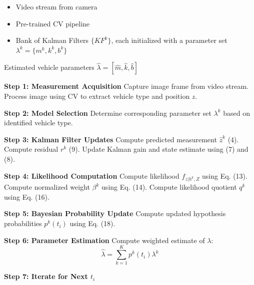 \documentclass[letterpaper, 10 pt, conference]{ieeeconf}  %
\begin{document}
\begin{algorithm}
\caption{CV Informed Multiple-Model Adaptive Estimation (MMAE) for Vehicle Parameter Estimation} 
\label{alg:mmae}
\begin{algorithmic}[1]
    \Require 
    \begin{itemize}
        \item Video stream from camera
        \item Pre-trained CV pipeline
        \item Bank of Kalman Filters $\{KF^k\}$, each initialized with a parameter set $\lambda^k = \{m^k, k^k, b^k\}$
    \end{itemize}
    \Ensure Estimated vehicle parameters $\hat{\lambda} = [\hat{m}, \hat{k}, \hat{b}]$
    
    \State \textbf{Step 1: Measurement Acquisition}
    \State Capture image frame from video stream.
    \State Process image using CV to extract vehicle type and position $z$.
    
    \State \textbf{Step 2: Model Selection}
    \State Determine corresponding parameter set $\lambda^k$ based on identified vehicle type.
    
    \State \textbf{Step 3: Kalman Filter Updates}
        \State Compute predicted measurement $\hat{z}^k$ (4).
        \State Compute residual $r^k$ (9).
        \State Update Kalman gain and state estimate using (7) and (8).
    \EndFor
    
    \State \textbf{Step 4: Likelihood Computation}
        \State Compute likelihood $f_{z | h^k, Z}$ using Eq. (13).
        \State Compute normalized weight $\beta^k$ using Eq. (14).
        \State Compute likelihood quotient $q^k$ using Eq. (16).
    \EndFor
    
    \State \textbf{Step 5: Bayesian Probability Update}
    \State Compute updated hypothesis probabilities $p^k(t_i)$ using Eq. (18).
    
    \State \textbf{Step 6: Parameter Estimation}
    \State Compute weighted estimate of $\lambda$:
    \[
        \hat{\lambda} = \sum_{k=1}^{K} p^k(t_i) \lambda^k
    \]
    
    \State \textbf{Step 7: Iterate for Next $t_i$}
\end{algorithmic}
\end{algorithm}
\end{document}
